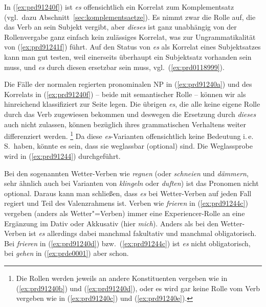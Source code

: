 In (\ref{ex:prd91240f}) ist \textit{es} offensichtlich ein Korrelat zum Komplementsatz (vgl.\ dazu Abschnitt~\ref{sec:komplementsaetze}).
Es nimmt zwar die Rolle auf, die das Verb an sein Subjekt vergibt, aber \textit{dieses} ist ganz unabhängig von der Rollenvergabe ganz einfach kein zulässiges Korrelat, was zur Ungrammatikalität von (\ref{ex:prd91241f}) führt.
Auf den Status von \textit{es} als Korrelat eines Subjektsatzes kann man gut testen, weil einerseits überhaupt ein Subjektsatz vorhanden sein muss, und \textit{es} durch diesen ersetzbar sein muss, vgl.\ (\ref{ex:prd0118999}).

\begin{exe}
\end{exe}

Die Fälle der normalen regierten pronominalen NP in (\ref{ex:prd91240a}) und des Korrelats in (\ref{ex:prd91240f}) -- beide mit semantischer Rolle -- können wir als hinreichend klassifiziert zur Seite legen.
Die übrigen \textit{es}, die alle keine eigene Rolle durch das Verb zugewiesen bekommen und deswegen die Ersetzung durch \textit{dieses} auch nicht zulassen, können bezüglich ihres grammatischen Verhaltens weiter differenziert werden.%
\footnote{Die Rollen werden jeweils an andere Konstituenten vergeben wie in (\ref{ex:prd91240b}) und (\ref{ex:prd91240d}), oder es wird gar keine Rolle vom Verb vergeben wie in (\ref{ex:prd91240c}) und (\ref{ex:prd91240e}).}
Da diese \textit{es}-Varianten offensichtlich keine Bedeutung i.\,e.\,S.\ haben, könnte es \zB sein, dass sie weglassbar (optional) sind.
Die Weglassprobe wird in (\ref{ex:prd91244}) durchgeführt.

\begin{exe}
  \ex\label{ex:prd91244}
  \begin{xlist}
  \end{xlist}
\end{exe}


Bei den sogenannten Wetter-Verben wie \textit{regnen} (oder \textit{schneien} und \textit{dämmern}, sehr ähnlich auch bei Varianten von \textit{klingeln} oder \textit{duften}) ist das Pronomen nicht optional.
Daraus kann man schließen, dass \textit{es} bei Wetter-Verben auf jeden Fall regiert und Teil des Valenzrahmens ist.
Verben wie \textit{frieren} in (\ref{ex:prd91244c}) vergeben (anders als Wetter"=Verben) immer eine Experiencer-Rolle an eine Ergänzung im Dativ oder Akkusativ (hier \textit{mich}).
Anders als bei den Wetter-Verben ist \textit{es} allerdings dabei manchmal fakultativ und manchmal obligatorisch.
Bei \textit{frieren} in (\ref{ex:prd91240d}) bzw.\ (\ref{ex:prd91244c}) ist \textit{es} nicht obligatorisch, bei \textit{gehen} in (\ref{ex:prde0001}) aber schon.

